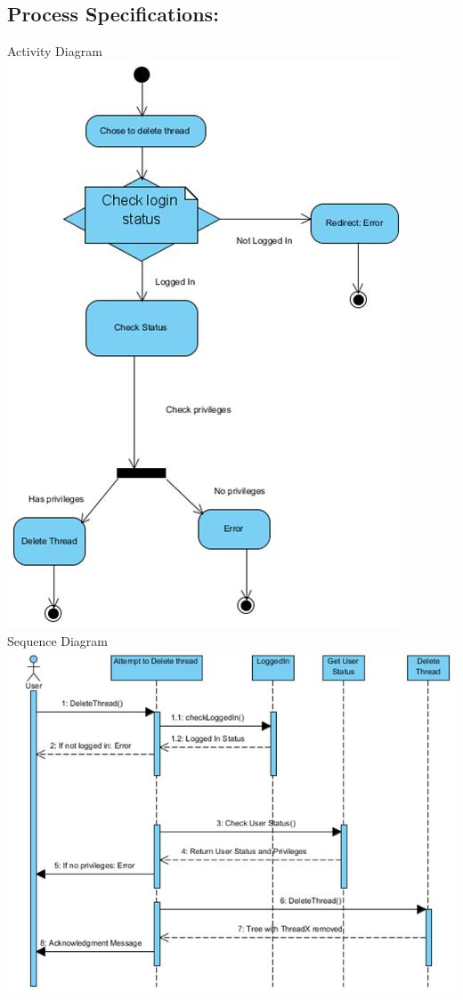 \documentclass[a4paper,11pt]{article}
\begin{document}
\subsection{Process Specifications:} 
Activity Diagram\\
\includegraphics[width=1\linewidth]{./Images/CRUDThread/Diagrams/15.jpg}\\
\newpage
Sequence Diagram\\
\includegraphics[width=1\linewidth]{./Images/CRUDThread/Diagrams/16.jpg}\\
\end{document}
